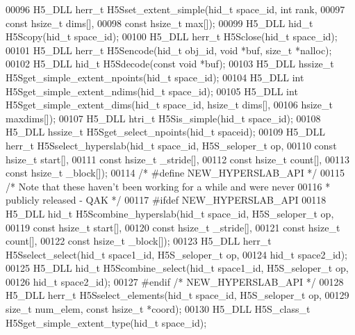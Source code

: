 \begin{DoxyCode}
00096 H5\_DLL herr\_t H5Sset\_extent\_simple(hid\_t space\_id, \textcolor{keywordtype}{int} rank,
00097                     \textcolor{keyword}{const} hsize\_t dims[],
00098                     \textcolor{keyword}{const} hsize\_t max[]);
00099 H5\_DLL hid\_t H5Scopy(hid\_t space\_id);
00100 H5\_DLL herr\_t H5Sclose(hid\_t space\_id);
00101 H5\_DLL herr\_t H5Sencode(hid\_t obj\_id, \textcolor{keywordtype}{void} *buf, \textcolor{keywordtype}{size\_t} *nalloc);
00102 H5\_DLL hid\_t H5Sdecode(\textcolor{keyword}{const} \textcolor{keywordtype}{void} *buf);
00103 H5\_DLL hssize\_t H5Sget\_simple\_extent\_npoints(hid\_t space\_id);
00104 H5\_DLL \textcolor{keywordtype}{int} H5Sget\_simple\_extent\_ndims(hid\_t space\_id);
00105 H5\_DLL \textcolor{keywordtype}{int} H5Sget\_simple\_extent\_dims(hid\_t space\_id, hsize\_t dims[],
00106                       hsize\_t maxdims[]);
00107 H5\_DLL htri\_t H5Sis\_simple(hid\_t space\_id);
00108 H5\_DLL hssize\_t H5Sget\_select\_npoints(hid\_t spaceid);
00109 H5\_DLL herr\_t H5Sselect\_hyperslab(hid\_t space\_id, H5S\_seloper\_t op,
00110                    \textcolor{keyword}{const} hsize\_t start[],
00111                    \textcolor{keyword}{const} hsize\_t \_stride[],
00112                    \textcolor{keyword}{const} hsize\_t count[],
00113                    \textcolor{keyword}{const} hsize\_t \_block[]);
00114 \textcolor{comment}{/* #define NEW\_HYPERSLAB\_API */}
00115 \textcolor{comment}{/* Note that these haven't been working for a while and were never}
00116 \textcolor{comment}{ *      publicly released - QAK */}
00117 \textcolor{preprocessor}{#ifdef NEW\_HYPERSLAB\_API}
00118 H5\_DLL hid\_t H5Scombine\_hyperslab(hid\_t space\_id, H5S\_seloper\_t op,
00119                    \textcolor{keyword}{const} hsize\_t start[],
00120                    \textcolor{keyword}{const} hsize\_t \_stride[],
00121                    \textcolor{keyword}{const} hsize\_t count[],
00122                    \textcolor{keyword}{const} hsize\_t \_block[]);
00123 H5\_DLL herr\_t H5Sselect\_select(hid\_t space1\_id, H5S\_seloper\_t op,
00124                                   hid\_t space2\_id);
00125 H5\_DLL hid\_t H5Scombine\_select(hid\_t space1\_id, H5S\_seloper\_t op,
00126                                   hid\_t space2\_id);
00127 \textcolor{preprocessor}{#endif }\textcolor{comment}{/* NEW\_HYPERSLAB\_API */}\textcolor{preprocessor}{}
00128 H5\_DLL herr\_t H5Sselect\_elements(hid\_t space\_id, H5S\_seloper\_t op,
00129     \textcolor{keywordtype}{size\_t} num\_elem, \textcolor{keyword}{const} hsize\_t *coord);
00130 H5\_DLL H5S\_class\_t H5Sget\_simple\_extent\_type(hid\_t space\_id);

\end{DoxyCode}
